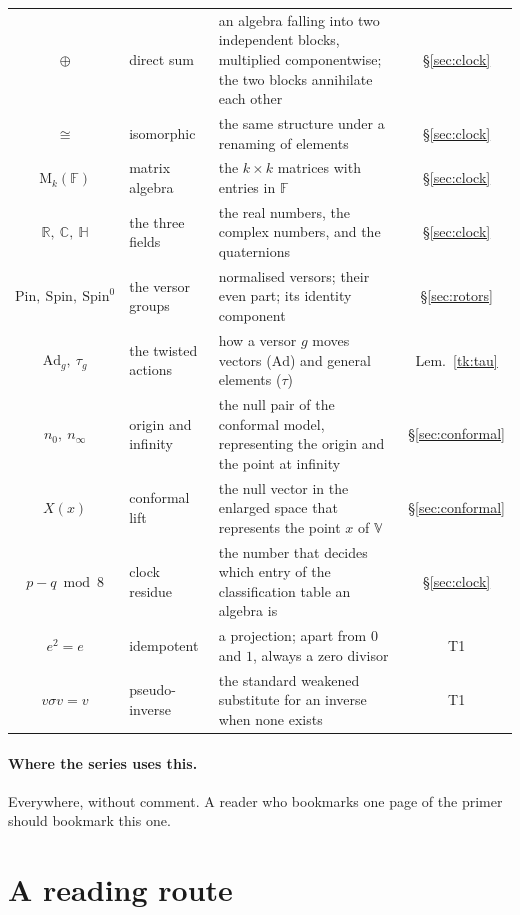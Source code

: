 \documentclass[11pt]{article}
\theoremstyle{plain}
\theoremstyle{definition}
\newcommand{\R}{\mathbb{R}}
\newcommand{\C}{\mathbb{C}}
\newcommand{\HH}{\mathbb{H}}
\newcommand{\Mat}{\mathrm{M}}
\newcommand{\Pin}{\mathrm{Pin}}
\newcommand{\Spin}{\mathrm{Spin}}
\newcommand{\Ad}{\mathrm{Ad}}
\begin{document}
\begin{center}
\begin{tabular}{cl>{\raggedright\arraybackslash}p{7.0cm}c}
$\oplus$ & direct sum & an algebra falling into two independent blocks, multiplied componentwise; the two blocks annihilate each other & \S\ref{sec:clock} \\
$\cong$ & isomorphic & the same structure under a renaming of elements & \S\ref{sec:clock} \\
$\Mat_k(\mathbb{F})$ & matrix algebra & the $k \times k$ matrices with entries in $\mathbb{F}$ & \S\ref{sec:clock} \\
$\R,\ \C,\ \HH$ & the three fields & the real numbers, the complex numbers, and the quaternions & \S\ref{sec:clock} \\
$\Pin,\ \Spin,\ \Spin^0$ & the versor groups & normalised versors; their even part; its identity component & \S\ref{sec:rotors} \\
$\Ad_g,\ \tau_g$ & the twisted actions & how a versor $g$ moves vectors ($\Ad$) and general elements ($\tau$) & Lem.\ \ref{tk:tau} \\
$n_0,\ n_\infty$ & origin and infinity & the null pair of the conformal model, representing the origin and the point at infinity & \S\ref{sec:conformal} \\
$X(x)$ & conformal lift & the null vector in the enlarged space that represents the point $x$ of $\mathbb{V}$ & \S\ref{sec:conformal} \\
$p - q \bmod 8$ & clock residue & the number that decides which entry of the classification table an algebra is & \S\ref{sec:clock} \\
$e^2 = e$ & idempotent & a projection; apart from $0$ and $1$, always a zero divisor & T1 \\
$v\sigma v = v$ & pseudo-inverse & the standard weakened substitute for an inverse when none exists & T1 \\
\bottomrule
\end{tabular}
\end{center}

\paragraph{Where the series uses this.} Everywhere, without comment. A reader who bookmarks one page of the primer should bookmark this one.

\section{A reading route}\label{sec:route}
\end{document}
